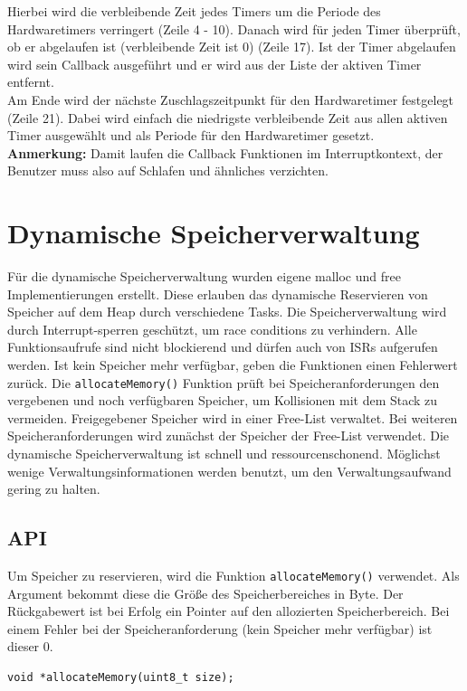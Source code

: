 \documentclass[fontsize=12pt, toc=bibliography, notitlepage]{scrreprt}
\begin{document}
Hierbei wird die verbleibende Zeit jedes Timers um die Periode des Hardwaretimers verringert (Zeile 4 - 10). Danach wird für jeden Timer überprüft, ob er abgelaufen ist (verbleibende Zeit ist 0) (Zeile 17). Ist der Timer abgelaufen wird sein Callback ausgeführt und er wird aus der Liste der aktiven Timer entfernt.\\
Am Ende wird der nächste Zuschlagszeitpunkt für den Hardwaretimer festgelegt (Zeile 21). Dabei wird einfach die niedrigste verbleibende Zeit aus allen aktiven Timer ausgewählt und als Periode für den Hardwaretimer gesetzt.\\
\textbf{Anmerkung:} Damit laufen die Callback Funktionen im Interruptkontext, der Benutzer muss also auf Schlafen und ähnliches verzichten.

\chapter{Dynamische Speicherverwaltung}
\label{chap:dynamische-speicherverwaltung}
Für die dynamische Speicherverwaltung wurden eigene malloc und free Implementierungen erstellt. Diese erlauben das dynamische Reservieren von Speicher auf dem Heap durch verschiedene Tasks. Die Speicherverwaltung wird durch Interrupt-sperren geschützt, um race conditions zu verhindern. Alle Funktionsaufrufe sind nicht blockierend und dürfen auch von ISRs aufgerufen werden. Ist kein Speicher mehr verfügbar, geben die Funktionen einen Fehlerwert zurück. Die \lstinline$allocateMemory()$ Funktion prüft bei Speicheranforderungen den vergebenen und noch verfügbaren Speicher, um Kollisionen mit dem Stack zu vermeiden. Freigegebener Speicher wird in einer Free-List verwaltet. Bei weiteren Speicheranforderungen wird zunächst der Speicher der Free-List verwendet. Die dynamische Speicherverwaltung ist schnell und ressourcenschonend. Möglichst wenige Verwaltungsinformationen werden benutzt, um den Verwaltungsaufwand gering zu halten. 

\section{API}
\label{subsec:mem-api}
Um Speicher zu reservieren, wird die Funktion \lstinline$allocateMemory()$ verwendet. Als Argument bekommt diese die Größe des Speicherbereiches in Byte. Der Rückgabewert ist bei Erfolg ein Pointer auf den allozierten Speicherbereich. Bei einem Fehler bei der Speicheranforderung (kein Speicher mehr verfügbar) ist dieser 0.

\begin{lstlisting}[title=memory.h]
void *allocateMemory(uint8_t size);
\end{lstlisting}
\end{document}
